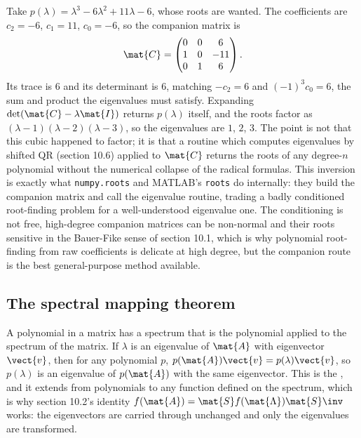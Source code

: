 \begin{example}
Take $p(\lambda) = \lambda^{3} - 6\lambda^{2} + 11\lambda - 6$, whose
roots are wanted. The coefficients are $c_{2} = -6$, $c_{1} = 11$,
$c_{0} = -6$, so the companion matrix is
\[
\mat{C} = \begin{pmatrix} 0 & 0 & 6 \\ 1 & 0 & -11 \\ 0 & 1 & 6
\end{pmatrix}.
\]
Its trace is $6$ and its determinant is $6$, matching $-c_{2} = 6$ and
$(-1)^{3}c_{0} = 6$, the sum and product the eigenvalues must satisfy.
Expanding $\det(\mat{C} - \lambda\mat{I})$ returns $p(\lambda)$ itself,
and the roots factor as $(\lambda - 1)(\lambda - 2)(\lambda - 3)$, so
the eigenvalues are $1$, $2$, $3$. The point is not that this cubic
happened to factor; it is that a routine which computes eigenvalues by
shifted QR (section 10.6) applied to $\mat{C}$ returns the roots of any
degree-$n$ polynomial without the numerical collapse of the
radical formulas. This inversion is exactly what \texttt{numpy.roots}
and MATLAB's \texttt{roots} do internally: they build the companion
matrix and call the eigenvalue routine, trading a badly conditioned
root-finding problem for a well-understood eigenvalue one. The
conditioning is not free, high-degree companion matrices can be
non-normal and their roots sensitive in the Bauer-Fike sense of
section 10.1, which is why polynomial root-finding from raw
coefficients is delicate at high degree, but the companion route is the
best general-purpose method available.
\end{example}

\subsection{The spectral mapping theorem}

A polynomial in a matrix has a spectrum that is the polynomial applied
to the spectrum of the matrix. If $\lambda$ is an eigenvalue of $\mat{A}$
with eigenvector $\vect{v}$, then for any polynomial $p$,
$p(\mat{A})\vect{v} = p(\lambda)\vect{v}$, so $p(\lambda)$ is an
eigenvalue of $p(\mat{A})$ with the same eigenvector. This is the
, and it extends from polynomials to
any function defined on the spectrum, which is why section 10.2's
identity $f(\mat{A}) = \mat{S}f(\mat{\Lambda})\mat{S}\inv$ works: the
eigenvectors are carried through unchanged and only the eigenvalues are
transformed.

